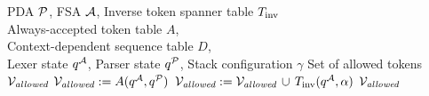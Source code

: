 
\begin{algorithm}[!t]
\caption{}
\label{alg:token-mask}
\begin{algorithmic}
      PDA $\mathcal{P}$, FSA $\mathcal{A}$, Inverse token spanner table $T_{\textrm{inv}}$ \\
    Always-accepted token table $A$,\\
    Context-dependent sequence table $D$, \\
    Lexer state $q^{\mathcal{A}}$, Parser state $q^{\mathcal{P}}$, Stack configuration $\gamma$
     Set of allowed tokens $\mathcal{V}_{\textit{allowed}}$
    \STATE $\mathcal{V}_{\textit{allowed}} := A(q^{\mathcal{A}}, q^{\mathcal{P}})$
            \STATE $\mathcal{V}_{\textit{allowed}} := \mathcal{V}_{\textit{allowed}} \,\cup\, T_{\textrm{inv}}(q^{\mathcal{A}}, \alpha)$
        \ENDIF
    \ENDFOR
    \RETURN $\mathcal{V}_{\textit{allowed}}$
\end{algorithmic}
\end{algorithm}




